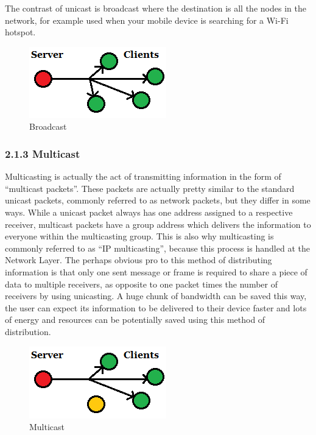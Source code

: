 \documentclass[9pt,a4paper]{acmproc}
\begin{document}
The contrast of unicast is broadcast where the destination is all the nodes in the network, for example used when your mobile device is searching for a Wi-Fi hotspot.
\begin{figure}[h!]
\includegraphics[width=\linewidth]{broadcast.png}
\caption{Broadcast}
\label{fig:Broadcast}
\end{figure}

\subsubsection*{2.1.3 Multicast}

Multicasting is actually the act of transmitting information in the form of “multicast packets”. These packets are actually pretty similar to the standard unicast packets, commonly referred to as network packets, but they differ in some ways. While a unicast packet always has one address assigned to a respective receiver, multicast packets have a group address which delivers the information to everyone within the multicasting group. This is also why multicasting is commonly referred to as “IP multicasting”, because this process is handled at the Network Layer. The perhaps obvious pro to this method of distributing information is that only one sent message or frame is required to share a piece of data to multiple receivers, as opposite to one packet times the number of receivers by using unicasting. A huge chunk of bandwidth can be saved this way, the user can expect its information to be delivered to their device faster and lots of energy and resources can be potentially saved using this method of distribution.
	
	\begin{figure}[h!]
\includegraphics[width=\linewidth]{multicast.png}
\caption{Multicast}
\label{fig:Multicast}
\end{figure}
\end{document}
